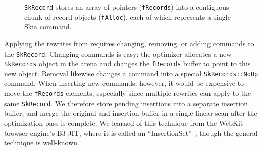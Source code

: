 \documentclass[main.tex]{subfiles}
\begin{document}
\begin{figure}[tbp]
  \centering
  \caption{
    \texttt{SkRecord} stores an array of pointers (\texttt{fRecords})
    into a contiguous chunk of record objects (\texttt{fAlloc}),
    each of which represents a single Skia command.
  }
  \label{fig:skrecord-layout}
\end{figure}

Applying the rewrites from 
  requires changing, removing, or adding commands
  to the \texttt{SkRecord}.
Changing commands is easy:
  the optimizer allocates a new \texttt{SkRecords} object in the arena
  and changes the \texttt{fRecords} buffer to point to this new object.
Removal likewise changes a command
  into a special \texttt{SkRecords::NoOp} command.
When inserting new commands, however,
  it would be expensive to move the \texttt{fRecords} elements,
  especially since multiple rewrites can apply to the same \texttt{SkRecord}.
We therefore store pending insertions into
  a separate insertion buffer,
  and merge the original and insertion buffer
  in a single linear scan
  after the optimization pass is complete.
We learned of this technique from the WebKit browser engine's B3 JIT,
  where it is called an ``InsertionSet''~\cite{insertionset},
  though the general technique is well-known.
\end{document}
